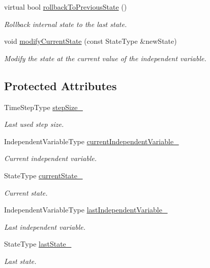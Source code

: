 \begin{DoxyCompactItemize}
virtual bool \hyperlink{classtudat_1_1numerical__integrators_1_1RungeKutta4Integrator_a5c08ffb9818f8e3d0de77cc3a91348ba}{rollback\+To\+Previous\+State} ()
\begin{DoxyCompactList}\small\item\em Rollback internal state to the last state. \end{DoxyCompactList}\item 
void \hyperlink{classtudat_1_1numerical__integrators_1_1RungeKutta4Integrator_a3d8adb2c8357f7eec0ded02ce2baa0ce}{modify\+Current\+State} (const State\+Type \&new\+State)
\begin{DoxyCompactList}\small\item\em Modify the state at the current value of the independent variable. \end{DoxyCompactList}\end{DoxyCompactItemize}
\subsection*{Protected Attributes}
\begin{DoxyCompactItemize}
\item 
Time\+Step\+Type \hyperlink{classtudat_1_1numerical__integrators_1_1RungeKutta4Integrator_a5a2e3512005fd7fbaed4bef510482d20}{step\+Size\+\_\+}
\begin{DoxyCompactList}\small\item\em Last used step size. \end{DoxyCompactList}\item 
Independent\+Variable\+Type \hyperlink{classtudat_1_1numerical__integrators_1_1RungeKutta4Integrator_acff656a92bdf99fac8e9164678f826b8}{current\+Independent\+Variable\+\_\+}
\begin{DoxyCompactList}\small\item\em Current independent variable. \end{DoxyCompactList}\item 
State\+Type \hyperlink{classtudat_1_1numerical__integrators_1_1RungeKutta4Integrator_a5baed5beb7ead145c26e8de0d85345dd}{current\+State\+\_\+}
\begin{DoxyCompactList}\small\item\em Current state. \end{DoxyCompactList}\item 
Independent\+Variable\+Type \hyperlink{classtudat_1_1numerical__integrators_1_1RungeKutta4Integrator_aa9662c91e40f32f2d64aac3354364780}{last\+Independent\+Variable\+\_\+}
\begin{DoxyCompactList}\small\item\em Last independent variable. \end{DoxyCompactList}\item 
State\+Type \hyperlink{classtudat_1_1numerical__integrators_1_1RungeKutta4Integrator_af20fd47fb589df540481aaf47c093efd}{last\+State\+\_\+}
\begin{DoxyCompactList}\small\item\em Last state. \end{DoxyCompactList}\end{DoxyCompactItemize}
